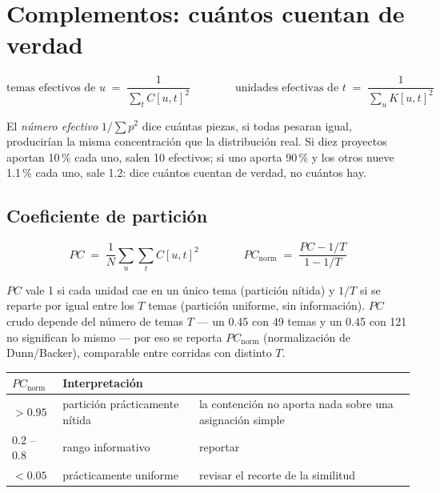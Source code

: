 \documentclass[11pt]{article}
\begin{document}
\section{Complementos: cuántos cuentan de verdad}

\begin{equation}
  \text{temas efectivos de } u \;=\; \frac{1}{\sum_t C[u,t]^2}
  \qquad\qquad
  \text{unidades efectivas de } t \;=\; \frac{1}{\sum_u K[u,t]^2}
\end{equation}

\noindent
El \emph{número efectivo} $1/\sum p^2$ dice cuántas piezas, si todas
pesaran igual, producirían la misma concentración que la distribución real.
Si diez proyectos aportan 10\,\% cada uno, salen 10 efectivos; si uno aporta
90\,\% y los otros nueve 1.1\,\% cada uno, sale 1.2: dice cuántos cuentan de
verdad, no cuántos hay.

\subsection{Coeficiente de partición}
\label{sec:particion}

\begin{equation}
  PC \;=\; \frac{1}{N}\sum_{u}\sum_{t} C[u,t]^2
  \qquad\qquad
  PC_{\text{norm}} \;=\; \frac{PC - 1/T}{1 - 1/T}
\end{equation}

\noindent
$PC$ vale 1 si cada unidad cae en un único tema (partición nítida) y $1/T$
si se reparte por igual entre los $T$ temas (partición uniforme, sin
información). $PC$ crudo depende del número de temas $T$ --- un 0.45 con 49
temas y un 0.45 con 121 no significan lo mismo --- por eso se reporta
$PC_{\text{norm}}$ (normalización de Dunn/Backer), comparable entre corridas
con distinto $T$.

\begin{center}
\begin{tabular}{@{}llp{6.2cm}@{}}
\toprule
$PC_{\text{norm}}$ & Interpretación & \\
\midrule
$> 0.95$ & partición prácticamente nítida & la contención no aporta nada sobre una asignación simple \\
$0.2$ -- $0.8$ & rango informativo & reportar \\
$< 0.05$ & prácticamente uniforme & revisar el recorte de la similitud \\
\bottomrule
\end{tabular}
\end{center}
\end{document}

